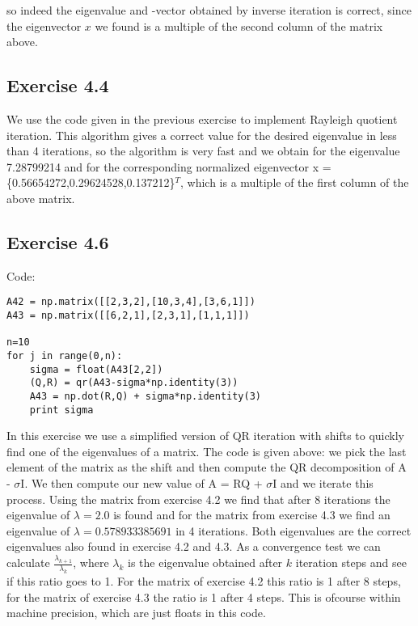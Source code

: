 \documentclass[10pt,a4paper]{article}
\begin{document}
\noindent so indeed the eigenvalue and -vector obtained by inverse iteration is correct, since the eigenvector $x$ we found is a multiple of the second column of the matrix above.

\subsection*{Exercise 4.4}
\noindent We use the code given in the previous exercise to implement Rayleigh quotient iteration. This algorithm gives a correct value for the desired eigenvalue in less than 4 iterations, so the algorithm is very fast and we obtain for the eigenvalue 7.28799214 and for the corresponding normalized eigenvector x = \{0.56654272,0.29624528,0.137212\}$^T$, which is a multiple of the first column of the above matrix.

\subsection*{Exercise 4.6}
Code:
\begin{lstlisting}
A42 = np.matrix([[2,3,2],[10,3,4],[3,6,1]])
A43 = np.matrix([[6,2,1],[2,3,1],[1,1,1]])

n=10
for j in range(0,n):
    sigma = float(A43[2,2])
    (Q,R) = qr(A43-sigma*np.identity(3))
    A43 = np.dot(R,Q) + sigma*np.identity(3)
    print sigma
\end{lstlisting}

\noindent In this exercise we use a simplified version of QR iteration with shifts to quickly find one of the eigenvalues of a matrix. The code is given above: we pick the last element of the matrix as the shift and then compute the QR decomposition of A - $\sigma$I. We then compute our new value of A = RQ + $\sigma$I and we iterate this process. Using the matrix from exercise 4.2 we find that after 8 iterations the eigenvalue of $\lambda = 2.0$ is found and for the matrix from exercise 4.3 we find an eigenvalue of $\lambda = 0.578933385691$ in 4 iterations. Both eigenvalues are the correct eigenvalues also found in exercise 4.2 and 4.3. As a convergence test we can calculate $\frac{\lambda_{k+1}}{\lambda_{k}}$, where $\lambda_{k}$ is the eigenvalue obtained after $k$ iteration steps and see if this ratio goes to 1. For the matrix of exercise 4.2 this ratio is 1 after 8 steps, for the matrix of exercise 4.3 the ratio is 1 after 4 steps. This is ofcourse within machine precision, which are just floats in this code.
\end{document}
